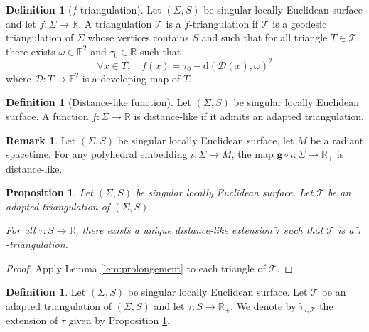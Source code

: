 \documentclass[a4paper,12pt]{article}
\def\D{\mathcal{D}}
\def\TT{\mathcal T}
\def\E{\mathbf E}
\def\d{\mathrm{d}}
\def\D{\mathcal{D}}
\def\E{\mathbb{E}}
\def\RR{\mathbb{R}}
\def\quadform{\mathbf{g}}
\def\E{\mathbb{E}}
\def\d{\mathrm{d}}
\def\D{\mathcal{D}}
\newcommand{\tautilde}[2]{\widetilde\tau_{#1,#2}}
\newtheorem{prop}[lem]{Proposition}
\theoremstyle{definition}
\newtheorem{defi}[lem]{Definition}	%
\newtheorem*{rem}{Remark}			 %
\begin{document}
                            \begin{defi}[$f$-triangulation]\label{def:triangulation}
                             Let $(\Sigma, S)$ be singular locally Euclidean surface and let $f:\Sigma \rightarrow \RR$. 
                             A triangulation $\TT$ is a $f$-triangulation if $\TT$ is a geodesic triangulation of $\Sigma$ whose vertices contains $S$ and such that for all triangle $T\in \TT$, there exists 
								$\omega \in \E^2$ and $\tau_0 \in \RR$ such that
								$$\forall x\in T,\quad f(x) = \tau_0-\d(\D(x),\omega)^2$$
								where $\D:T\rightarrow \E^2$ is a developing map of $T$.
                             
                            \end{defi}

							\begin{defi}[Distance-like function]\label{def:distance_like_function}
								Let $(\Sigma, S)$ be singular locally Euclidean surface. A function $f:\Sigma \rightarrow \RR$ is distance-like if it admits an adapted triangulation.
							\end{defi}

							
							\begin{rem}\label{rem:singular_locally_euclidean_surface} 
							 Let $(\Sigma, S)$ be singular locally Euclidean surface, let $M$ be a radiant spacetime. For any polyhedral embedding $\iota:\Sigma\rightarrow M$, the map $\quadform\circ \iota: \Sigma\rightarrow \RR_+$ is distance-like.
							\end{rem}

							\begin{prop}\label{prop:prolongement} 
							Let $(\Sigma, S)$ be singular locally Euclidean surface.
							Let $\TT$ be an adapted triangulation of $(\Sigma, S)$.

									For all $\tau:S\rightarrow \RR$, there exists a unique distance-like extension $\widetilde\tau$ such that $\TT$ is a $\widetilde\tau$-triangulation.
							\end{prop}
							\begin{proof} Apply Lemma \ref{lem:prolongement} to each triangle of $\TT$.
							\end{proof}
							\begin{defi}\label{def:singular_locally_euclidean_surface} 
							Let $(\Sigma, S)$ be singular locally Euclidean surface.
							Let $\TT$ be an adapted triangulation  of $(\Sigma, S)$ and let $\tau:S\rightarrow \RR_+$. 
							We denote by
							 $\tautilde{\tau}{\TT}$ the extension of $\tau$ given by Proposition \ref{prop:prolongement}.
							 
							\end{defi}
\end{document}
